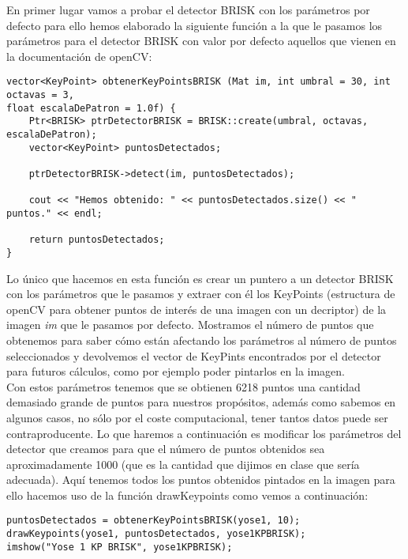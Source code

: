 \documentclass[10pt,a4paper]{article}
\begin{document}
En primer lugar vamos a probar el detector BRISK con los parámetros por defecto para ello hemos elaborado la siguiente función a la que le pasamos los parámetros para el detector BRISK con valor por defecto aquellos que vienen en la documentación de openCV:\\

\begin{lstlisting}
vector<KeyPoint> obtenerKeyPointsBRISK (Mat im, int umbral = 30, int octavas = 3, 
float escalaDePatron = 1.0f) {
	Ptr<BRISK> ptrDetectorBRISK = BRISK::create(umbral, octavas, escalaDePatron);
	vector<KeyPoint> puntosDetectados;

	ptrDetectorBRISK->detect(im, puntosDetectados);

	cout << "Hemos obtenido: " << puntosDetectados.size() << " puntos." << endl;

	return puntosDetectados;
}
\end{lstlisting}

Lo único que hacemos en esta función es crear un puntero a un detector BRISK con los parámetros que le pasamos y extraer con él los KeyPoints (estructura de openCV para obtener puntos de interés de una imagen con un decriptor) de la imagen \textit{im} que le pasamos por defecto. Mostramos el número de puntos que obtenemos para saber cómo están afectando los parámetros al número de puntos seleccionados y devolvemos el vector de KeyPints encontrados por el detector para futuros cálculos, como por ejemplo poder pintarlos en la imagen.\\

Con estos parámetros tenemos que se obtienen 6218 puntos una cantidad demasiado grande de puntos para nuestros propósitos, además como sabemos en algunos casos, no sólo por el coste computacional, tener tantos datos puede ser contraproducente. Lo que haremos a continuación es modificar los parámetros del detector que creamos para que el número de puntos obtenidos sea aproximadamente 1000 (que es la cantidad que dijimos en clase que sería adecuada). Aquí tenemos todos los puntos obtenidos pintados en la imagen para ello hacemos uso de la función drawKeypoints como vemos a continuación:\\

\begin{lstlisting}
puntosDetectados = obtenerKeyPointsBRISK(yose1, 10);
drawKeypoints(yose1, puntosDetectados, yose1KPBRISK);
imshow("Yose 1 KP BRISK", yose1KPBRISK);
\end{lstlisting}
\end{document}
